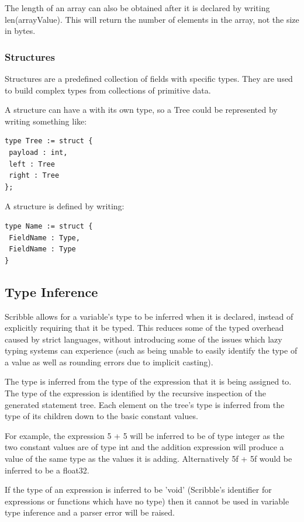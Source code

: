 \documentclass[]{final_report}
\begin{document}
The length of an array can also be obtained after it is declared by writing len(arrayValue). This will return the number of elements in the array, not the size in bytes.

\subsubsection{Structures}

Structures are a predefined collection of fields with specific types. They are used to build complex types from collections of primitive data.

A structure can have a with its own type, so a Tree could be represented by writing something like:\begin{verbatim}
type Tree := struct {
 payload : int, 
 left : Tree
 right : Tree
};
\end{verbatim}

A structure is defined by writing:
\begin{verbatim}
type Name := struct {
 FieldName : Type,
 FieldName : Type
}
\end{verbatim}

\subsection{Type Inference}

Scribble allows for a variable's type to be inferred when it is declared, instead of explicitly requiring that it be typed. This reduces some of the typed overhead caused by strict languages, without introducing some of the issues which lazy typing systems can experience (such as being unable to easily identify the type of a value as well as rounding errors due to implicit casting).

The type is inferred from the type of the expression that it is being assigned to. The type of the expression is identified by the recursive inspection of the generated statement tree. Each element on the tree's type is inferred from the type of its children down to the basic constant values.

For example, the expression 5 + 5 will be inferred to be of type integer as the two constant values are of type int and the addition expression will produce a value of the same type as the values it is adding. Alternatively 5f + 5f would be inferred to be a float32.

If the type of an expression is inferred to be 'void' (Scribble's identifier for expressions or functions which have no type) then it cannot be used in variable type inference and a parser error will be raised.
\end{document}
